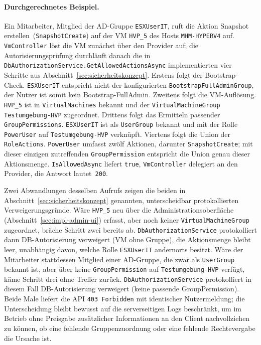 \documentclass[12pt,a4paper]{article}
\begin{document}
\paragraph{Durchgerechnetes Beispiel.} Ein Mitarbeiter, Mitglied der AD-Gruppe \texttt{ESXUserIT}, ruft die Aktion \glqq Snapshot erstellen\grqq\ (\texttt{SnapshotCreate}) auf der VM \texttt{HVP\_5} des Hosts \texttt{MHM-HYPERV4} auf. \texttt{VmController} löst die VM zunächst über den Provider auf; die Autorisierungsprüfung durchläuft danach die in \texttt{DbAuthorizationService.GetAllowedActionsAsync} implementierten vier Schritte aus Abschnitt~\ref{sec:sicherheitskonzept}. Erstens folgt der Bootstrap-Check. \texttt{ESXUserIT} entspricht nicht der konfigurierten \texttt{BootstrapFullAdminGroup}, der Nutzer ist somit kein Bootstrap-FullAdmin. Zweitens folgt die VM-Auflösung. \texttt{HVP\_5} ist in \texttt{VirtualMachines} bekannt und der \texttt{VirtualMachineGroup} \texttt{Testumgebung-HVP} zugeordnet. Drittens folgt das Ermitteln passender \texttt{GroupPermissions}. \texttt{ESXUserIT} ist als \texttt{UserGroup} bekannt und mit der Rolle \texttt{PowerUser} auf \texttt{Testumgebung-HVP} verknüpft. Viertens folgt die Union der \texttt{RoleActions}. \texttt{PowerUser} umfasst zwölf Aktionen, darunter \texttt{SnapshotCreate}; mit dieser einzigen zutreffenden \texttt{GroupPermission} entspricht die Union genau dieser Aktionsmenge. \texttt{IsAllowedAsync} liefert \texttt{true}, \texttt{VmController} delegiert an den Provider, die Antwort lautet~\texttt{200}.

Zwei Abwandlungen desselben Aufrufs zeigen die beiden in Abschnitt~\ref{sec:sicherheitskonzept} genannten, unterscheidbar protokollierten Verweigerungsgründe. Wäre \texttt{HVP\_5} neu über die Administrationsoberfläche (Abschnitt~\ref{sec:impl-admin-ui}) erfasst, aber noch keiner \texttt{VirtualMachineGroup} zugeordnet, bräche Schritt zwei bereits ab. \texttt{DbAuthorizationService} protokolliert dann \glqq DB-Autorisierung verweigert (VM ohne Gruppe)\grqq, die Aktionsmenge bleibt leer, unabhängig davon, welche Rolle \texttt{ESXUserIT} andernorts besitzt. Wäre der Mitarbeiter stattdessen Mitglied einer AD-Gruppe, die zwar als \texttt{UserGroup} bekannt ist, aber über keine \texttt{GroupPermission} auf \texttt{Testumgebung-HVP} verfügt, käme Schritt drei ohne Treffer zurück. \texttt{DbAuthorizationService} protokolliert in diesem Fall \glqq DB-Autorisierung verweigert (keine passende GroupPermission)\grqq. Beide Male liefert die API \texttt{403 Forbidden} mit identischer Nutzermeldung; die Unterscheidung bleibt bewusst auf die serverseitigen Logs beschränkt, um im Betrieb ohne Preisgabe zusätzlicher Informationen an den Client nachvollziehen zu können, ob eine fehlende Gruppenzuordnung oder eine fehlende Rechtevergabe die Ursache ist.
\end{document}
